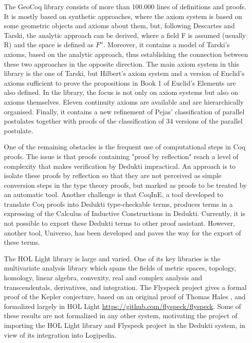 \begin{workpackage}[id=libraries,type=RTD,
  short={Large libraries},%
  title={Large libraries},
  lead=Tum,
  StrRM=18,
  ChaRM=12,
  TumRM=27]
\begin{tasklist}
\begin{task}[
  id=geocoq,
  title=The GeoCoq library,
  lead=Str,
  StrRM=18,
  wphases=1-18]
%
The GeoCoq library consists of more than 100.000 lines of definitions and proofs. It is mostly based on synthetic approaches, where the axiom system is based on some geometric objects and axioms about them, but, following Descartes and Tarski, the analytic approach can be derived, where a field F is assumed (usually R) and the space is defined as $F^n$. Moreover, it contains a model of Tarski's axioms, based on the analytic approach, thus establishing the connection between these two approaches in the opposite direction. The main axiom system in this library is the one of Tarski, but Hilbert's axiom system and a version of Euclid's axioms sufficient to prove the propositions in Book 1 of Euclid's Elements are also defined. In the library, the focus is not only on axiom systems but also on axioms themselves. Eleven continuity axioms are available and are hierarchically organised. Finally, it contains a new refinement of Pejas’ classification of parallel postulates together with proofs of the classification of 34 versions of the parallel postulate.

One of the remaining obstacles is the frequent use of computational steps in Coq proofs. The issue is that proofs containing "proof by reflection" reach a level of complexity that makes verification by Dedukti impractical. An approach is to isolate these proofs by reflection so that they are not perceived as simple conversion steps in the type theory proofs, but marked as proofs to be treated by an automatic tool. Another challenge is that CoqInE, a tool developed to translate Coq proofs into Dedukti type-checkable terms, produces terms in a expressing of the Calculus of Inductive Constructions in Dedukti. Currently, it is not possible to export these Dedukti terms to other proof assistant. However, another tool, Universo, has been developed and paves the way for the export of these terms.
\end{task}

\begin{task}[
  id=flyspeck,
  title=The Flyspeck library,
  lead=Inr,
  wphases=1-36]
The {HOL Light} library is large and varied. One of its key libraries is the
multivariate analysis library
which spans the fields of metric spaces, topology, homology, linear algebra,
convexity, real and complex analysis and transcendentals, derivatives, and
integration. The {Flyspeck} project gives a formal proof of the {Kepler}
conjecture, based on an original proof of Thomas {Hales}
\cite{DBLP:journals/corr/HalesABDHHKMMNNNOPRSTTTUVZ15}, and formalized
largely in {HOL Light} \url{https://github.com/flyspeck/flyspeck}.
Some of these results are not formalized in any other system, motivating the
project of importing the {HOL Light} library and {Flyspeck} project in the
{Dedukti} system, in view of its integration into {Logipedia}.


\end{task}
\end{tasklist}
\end{workpackage}
